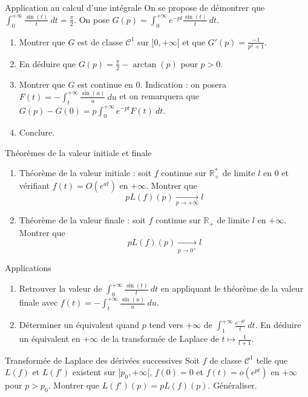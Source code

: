 \documentclass[french,a4paper]{article}
\newcommand{\R}{\mathbb{R}}
\newcommand{\st}{^*}
\theoremstyle{plain}
\theoremstyle{definition}
\theoremstyle{remark}
\begin{document}
\begin{ex}[Châteaux]{Application au calcul d'une intégrale}
	On se propose de démontrer que $\displaystyle\int_{0}^{+\infty}\frac{\sin(t)}{t}\ dt=\frac{\pi}{2}$. On pose $G(p)=\displaystyle\int_{0}^{+\infty}e^{-pt}\frac{\sin(t)}{t}\ dt$.
	\begin{enumerate}
		\item Montrer que $G$ est de classe $\mathcal{C}^1$ sur $]0,+\infty[$ et que $G'(p)=\displaystyle\frac{-1}{p^2+1}$.
		\item En déduire que $G(p)=\displaystyle\frac{\pi}{2}-\arctan(p)$ pour $p>0$.
		\item Montrer que $G$ est continue en $0$. Indication : on posera $F(t)=\displaystyle-\int_{t}^{+\infty}\frac{\sin(u)}{u}\ du$ et on remarquera que $G(p)-G(0)=p\int_{0}^{+\infty}e^{-pt}F(t)\ dt$.
		\item Conclure.
	\end{enumerate}	
\end{ex}

\begin{ex}[Châteaux]{Théorèmes de la valeur initiale et finale}
	\begin{enumerate}
		\item Théorème de la valeur initiale : soit $f$ continue sur $\R_+\st$ de limite $l$ en $0$ et vérifiant $f(t)=O(e^{at})$ en $+\infty$. Montrer que $$pL(f)(p)\xrightarrow[p\to+\infty]{}l$$
		\item Théorème de la valeur finale : soit $f$ continue sur $\R_+$ de limite $l$ en $+\infty$. Montrer que $$pL(f)(p)\xrightarrow[p\to0^+]{}l$$
	\end{enumerate}
\end{ex}
\begin{ex}[Châteaux]{Applications}
	\begin{enumerate}
		\item Retrouver la valeur de $\displaystyle\int_{0}^{+\infty}\frac{\sin(t)}{t}\ dt$ en appliquant le théorème de la valeur finale avec $f(t)=-\displaystyle\int_{t}^{+\infty}\frac{\sin(u)}{u}\ du$.
		\item Déterminer un équivalent quand $p$ tend vers $+\infty$ de $\displaystyle\int_{1}^{+\infty}\frac{e^{-pt}}{t}\ dt$. En déduire un équivalent en $+\infty$ de la transformée de Laplace de $\displaystyle t\mapsto\frac{1}{t+1}$.
	\end{enumerate}
\end{ex}

\begin{ex}[Châteaux]{Transformée de Laplace des dérivées successives}
	Soit $f$ de classe $\mathcal{C}^1$
	telle que $L(f)$ et $L(f')$ existent sur $]p_0,+\infty[$, $f(0)=0$ et $f(t)=o(e^{pt})$ en $+\infty$ pour $p>p_0$. Montrer que $L(f')(p)=pL(f)(p)$. Généraliser.
\end{ex}
\end{document}
